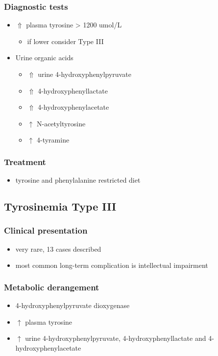 \documentclass{scrartcl}
\begin{document}
\subsubsection{Diagnostic tests}
\label{sec:org6f4fe00}
\begin{itemize}
\item \(\Uparrow\) plasma tyrosine > 1200 umol/L
\begin{itemize}
\item if lower consider Type III
\end{itemize}
\item Urine organic acids
\begin{itemize}
\item \(\Uparrow\) urine 4-hydroxyphenylpyruvate
\item \(\Uparrow\) 4-hydroxyphenyllactate
\item \(\Uparrow\) 4-hydroxyphenylacetate
\item \(\uparrow\) N-acetyltyrosine
\item \(\uparrow\) 4-tyramine
\end{itemize}
\end{itemize}

\subsubsection{Treatment}
\label{sec:orgd9dc560}
\begin{itemize}
\item tyrosine and phenylalanine restricted diet
\end{itemize}

\subsection{Tyrosinemia Type III}
\label{sec:org88d1117}
\subsubsection{Clinical presentation}
\label{sec:orgb8c91ab}
\begin{itemize}
\item very rare, 13 cases described
\item most common long-term complication is intellectual impairment
\end{itemize}
\subsubsection{Metabolic derangement}
\label{sec:orgb838085}
\begin{itemize}
\item 4-hydroxyphenylpyruvate dioxygenase
\end{itemize}
\begin{itemize}
\item \(\uparrow\) plasma tyrosine
\item \(\uparrow\) urine 4-hydroxyphenylpyruvate, 4-hydroxyphenyllactate and 4-hydroxyphenylacetate
\end{itemize}
\end{document}
